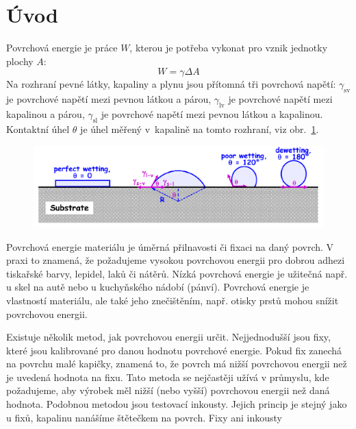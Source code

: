 \documentclass{protokol}
\begin{document}
\header
\section{Úvod}
\par Povrchová energie je práce $W$, kterou je potřeba vykonat pro vznik 
jednotky plochy $A$:
\begin{equation}
	W = \gamma\Delta A
\end{equation}
Na rozhraní pevné látky, kapaliny a plynu jsou přítomná tři povrchová napětí: 
$\gamma_{\text{sv}}$ je povrchové napětí mezi pevnou látkou a párou, 
$\gamma_{\text{lv}}$ je 
povrchové napětí mezi kapalinou a párou, $\gamma_{\text{sl}}$ je povrchové 
napětí 
mezi pevnou látkou a kapalinou. Kontaktní úhel $\theta$ je úhel měřený 
v~kapalině na tomto rozhraní, viz obr.~\ref{wetting}. 
\begin{figure}[b]
	\begin{center}
		\includegraphics[width=\textwidth]{wetting.png}
		\label{wetting}
	\end{center} 
\end{figure}
\par Povrchová energie materiálu je úměrná přilnavosti či fixaci na daný 
povrch. V praxi to znamená, že požadujeme vysokou povrchovou energii pro dobrou 
adhezi tiskařské barvy, lepidel, laků či nátěrů. Nízká povrchová energie je 
užitečná např. u skel na autě nebo u kuchyňského nádobí (pánví). Povrchová 
energie je vlastností materiálu, ale také jeho znečištěním, 
např. otisky prstů mohou snížit povrchovou energii.
\par Existuje několik metod, jak povrchovou energii určit. Nejjednodušší jsou 
fixy, které jsou kalibrované pro danou hodnotu povrchové energie. Pokud fix 
zanechá na povrchu malé kapičky, znamená to, že povrch má nižší povrchovou 
energii než je uvedená hodnota na fixu. Tato metoda se nejčastěji užívá v 
průmyslu, kde požadujeme, aby výrobek měl nižší (nebo vyšší) povrchovou energii 
než daná hodnota. Podobnou metodou jsou testovací inkousty. Jejich princip je 
stejný jako u fixů, kapalinu nanášíme štětečkem na povrch. Fixy ani inkousty 
\end{document}
